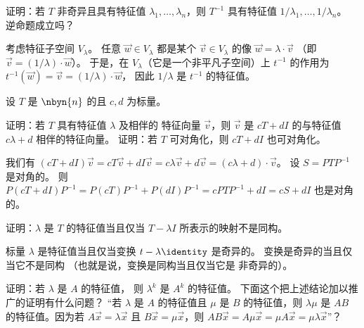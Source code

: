     证明：若 \( T \) 非奇异且具有特征值
    \( \lambda_1,\dots,\lambda_n \)，则 \( T^{-1} \) 具有特征值
    \( 1/\lambda_1,\dots,1/\lambda_n \)。
    逆命题成立吗？
    \begin{answer}
      考虑特征子空间 $V_{\lambda}$。
      任意 $\vec{w}\in V_{\lambda}$ 都是某个 $\vec{v}\in V_{\lambda}$
      的像 $\vec{w}=\lambda\cdot\vec{v}$
      （即 $\vec{v}=(1/\lambda)\cdot\vec{w}$）。
      于是，在 $V_{\lambda}$（它是一个非平凡子空间）上
      $t^{-1}$ 的作用为
      $t^{-1}(\vec{w})=\vec{v}=(1/\lambda)\cdot\vec{w}$，
      因此 $1/\lambda$ 是 $t^{-1}$ 的特征值。
    \end{answer}
  \recommended \item
    设 \( T \) 是 \( \nbyn{n} \) 的且 \( c,d \) 为标量。
    \begin{exparts}
      \partsitem 证明：若 \( T \) 具有特征值
        \( \lambda \) 及相伴的
        特征向量 \( \vec{v} \)，则 \( \vec{v} \) 是
        \( cT+dI \) 的与特征值 \( c\lambda+d \) 相伴的特征向量。
      \partsitem 证明：若 \( T \) 可对角化，则
        \( cT+dI \) 也可对角化。
    \end{exparts}
    \begin{answer}
      \begin{exparts}
        \partsitem 我们有
          $(cT+dI)\vec{v}=cT\vec{v}+dI\vec{v}=c\lambda\vec{v}+d\vec{v}
               =(c\lambda+d)\cdot \vec{v}$。
        \partsitem 设 $S=PTP^{-1}$ 是对角的。
          则 $P(cT+dI)P^{-1}=P(cT)P^{-1}+P(dI)P^{-1}
                 =cPTP^{-1}+dI=cS+dI$ 也是对角的。
      \end{exparts}
    \end{answer}
  \recommended \item
    证明：\( \lambda \) 是 \( T \) 的特征值当且仅当
    \( T-\lambda I \) 所表示的映射不是同构。
    \begin{answer}
      标量 $\lambda$ 是特征值当且仅当变换
      $t-\lambda \identity$ 是奇异的。
      变换是奇异的当且仅当它不是同构
      （也就是说，变换是同构当且仅当它是
      非奇异的）。
    \end{answer}
  \item \cite{Strang} 
    \begin{exparts}
      \partsitem 证明：若 \( \lambda \) 是 \( A \) 的特征值，
         则 \( \lambda^k \) 是 \( A^k \) 的特征值。
      \partsitem 下面这个把上述结论加以推广的证明有什么问题？
         “若 \( \lambda \) 是 \( A \) 的特征值且 \( \mu \) 是
         \( B \) 的特征值，则 \( \lambda\mu \) 是
         \( AB \) 的特征值。因为若 \( A\vec{x}=\lambda\vec{x} \)
         且 \( B\vec{x}=\mu\vec{x} \)，则
         \( AB\vec{x}=A\mu\vec{x}=\mu A\vec{x}=\mu\lambda\vec{x} \)”？
    \end{exparts}
